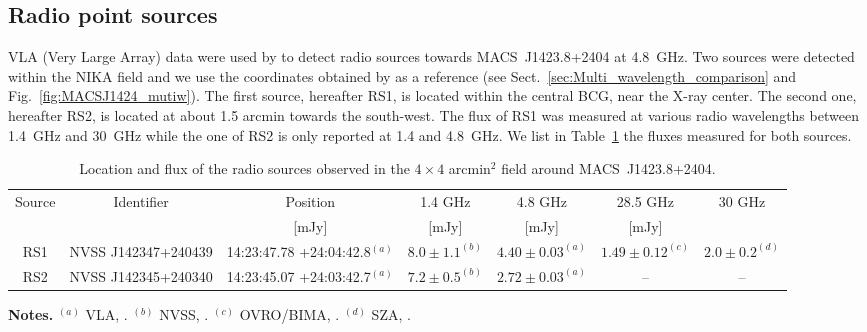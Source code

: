 \documentclass[twocolumn,traditabstract]{aa}
\begin{document}
\subsection{Radio point sources}
VLA (Very Large Array) data were used by \cite{laroque2003} to detect radio sources towards \mbox{MACS~J1423.8+2404} at 4.8~GHz. Two sources were detected within the NIKA field and we use the coordinates obtained by \cite{laroque2003} as a reference (see Sect.~\ref{sec:Multi_wavelength_comparison} and Fig.~\ref{fig:MACSJ1424_mutiw}). The first source, hereafter RS1, is located within the central BCG, near the X-ray center. The second one, hereafter RS2, is located at about 1.5 arcmin towards the south-west. The flux of RS1 was measured at various radio wavelengths between 1.4~GHz and 30~GHz while the one of RS2 is only reported at 1.4 and 4.8~GHz. We list in Table~\ref{tab:Radio_ps} the fluxes measured for both sources. 
\begin{table}[h]
\caption{Location and flux of the radio sources observed in the $4 \times 4$ arcmin$^2$ field around \mbox{MACS~J1423.8+2404}.}
\begin{center}
\begin{tabular}{ccccccc}
\hline
\hline
Source & Identifier & Position & 1.4 GHz & 4.8 GHz & 28.5 GHz & 30 GHz \\
 &  & [mJy] & [mJy] & [mJy] & [mJy] \\
\hline
RS1 & NVSS J142347+240439 & 14:23:47.78 +24:04:42.8$^{(a)}$ & $8.0 \pm 1.1 ^{(b)}$ & $4.40 \pm 0.03 ^{(a)}$ & $1.49 \pm 0.12 ^{(c)}$ & $2.0 \pm 0.2 ^{(d)}$ \\
RS2 & NVSS J142345+240340 & 14:23:45.07 +24:03:42.7$^{(a)}$ & $7.2 \pm 0.5 ^{(b)}$ & $2.72 \pm 0.03 ^{(a)}$ &  -- & --  \\  
\hline
\end{tabular}
\end{center}
{\small {\bf Notes.} $^{(a)}$ VLA, \cite{laroque2003}. $^{(b)}$ NVSS, \cite{condon1998}. $^{(c)}$ OVRO/BIMA, \cite{coble2007}. $^{(d)}$ SZA, \cite{bonamente2012}.}
\label{tab:Radio_ps}
\end{table}
\end{document}
